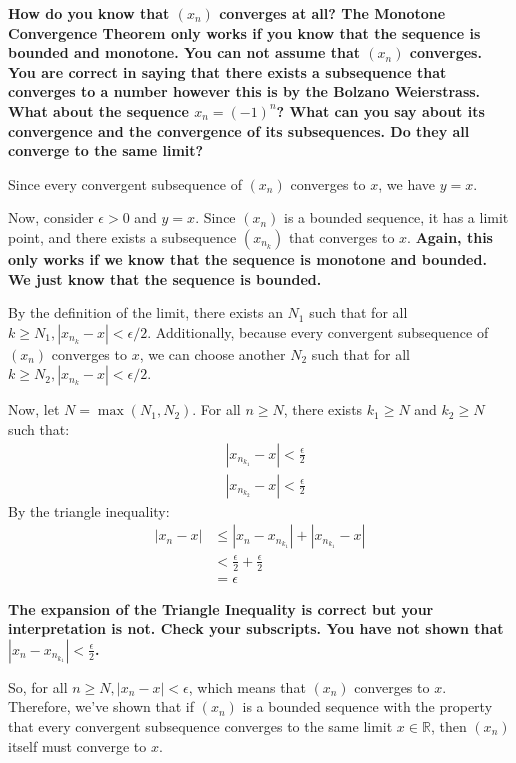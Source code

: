 \documentclass{report}
\begin{document}
\textbf{
How do you know that $(x_n)$ converges at all? The Monotone Convergence Theorem only works if you know that the sequence is bounded and monotone. You can not assume that $(x_n)$ converges. You are correct in saying that there exists a subsequence that converges to a number however this is by the Bolzano Weierstrass. What about the sequence $x_n = (-1)^n$? What can you say about its convergence and the convergence of its subsequences. Do they all converge to the same limit?
}


Since every convergent subsequence of $\left(x_n\right)$ converges to $x$, we have $y=x$.

Now, consider $\epsilon>0$ and $y=x$. Since $\left(x_n\right)$ is a bounded sequence, it has a limit point, and there exists a subsequence $\left(x_{n_k}\right)$ that converges to $x$.
\textbf{Again, this only works if we know that the sequence is monotone and bounded. We just know that the sequence is bounded.}

By the definition of the limit, there exists an $N_1$ such that for all $k \geq N_1,\left|x_{n_{k}}-x\right|<\epsilon / 2$.
Additionally, because every convergent subsequence of $\left(x_n\right)$ converges to $x$, we can choose another $N_2$ such that for all $k \geq N_2,\left|x_{n_k}-x\right|<\epsilon / 2$.

Now, let $N=\max \left(N_1, N_2\right)$. For all $n \geq N$, there exists $k_1 \geq N$ and $k_2 \geq N$ such that:
$$
\begin{aligned}
& \left|x_{n_{k_1}}-x\right|<\frac{\epsilon}{2} \\
& \left|x_{n_{k_2}}-x\right|<\frac{\epsilon}{2}
\end{aligned}
$$
By the triangle inequality:
$$
\begin{aligned}
\left|x_n-x\right| & \leq\left|x_n-x_{n_{k_1}}\right|+\left|x_{n_{k_1}}-x\right| \\
& <\frac{\epsilon}{2}+\frac{\epsilon}{2} \\
& =\epsilon
\end{aligned}
$$

\textbf{The expansion of the Triangle Inequality is correct but your interpretation is not. Check your subscripts. You have not shown that $\left|x_n-x_{n_{k_1}}\right| < \frac{\epsilon}{2}$.}


So, for all $n \geq N,\left|x_n-x\right|<\epsilon$, which means that $\left(x_n\right)$ converges to $x$.
Therefore, we've shown that if $\left(x_n\right)$ is a bounded sequence with the property that every convergent subsequence converges to the same limit $x \in \mathbb{R}$, then $\left(x_n\right)$ itself must converge to $x$.
\end{document}
